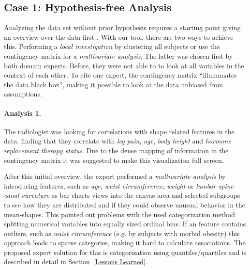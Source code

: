\documentclass[journal]{style/vgtc} 			          %
\begin{document}
\subsection{Case 1: Hypothesis-free Analysis} \label{Hypothesis-free analysis}
Analyzing the data set without prior hypothesis requires a starting point giving an overview over the data first \cite{Shneiderman1996}.
%
With our tool, there are two ways to achieve this.
%
Performing a \emph{local investigation} by clustering all subjects or use the contingency matrix for a \emph{multivariate analysis}.
%
The latter was chosen first by both domain experts.
%
Before, they were not able to to look at all variables in the context of each other.
%
%
To cite one expert, the contingency matrix ``illumunates the data black box'', making it possible to look at the data unbiased from assumptions.

\paragraph{Analysis 1.}
%
The radiologist was looking for correlations with shape related features in the data, finding that they correlate with \emph{leg pain}, \emph{age}, \emph{body height} and \emph{hormone replacement therapy status}.
%
Due to the dense mapping of information in the contingency matrix it was suggested to make this visualization full screen.

After this initial overview, the expert performed a \emph{multivariate analysis} by introducing features, such as \emph{age}, \emph{waist circumference}, \emph{weight} or \emph{lumbar spine canal curvature} as bar charts views into the canvas area and selected subgroups to see how they are distributed and if they could observe unusual behavior in the mean-shapes.
%
This pointed out problems with the used categorization method splitting numerical variables into equally sized ordinal bins.
%
If an feature contains outliers, such as \emph{waist circumference} (e.g. by subjects with morbid obesity) this approach leads to sparse categories, making it hard to calculate associations.
%
The proposed expert solution for this is categorization using quantiles/quartiles and is described in detail in Section~\ref{Lessons Learned}.
\end{document}

